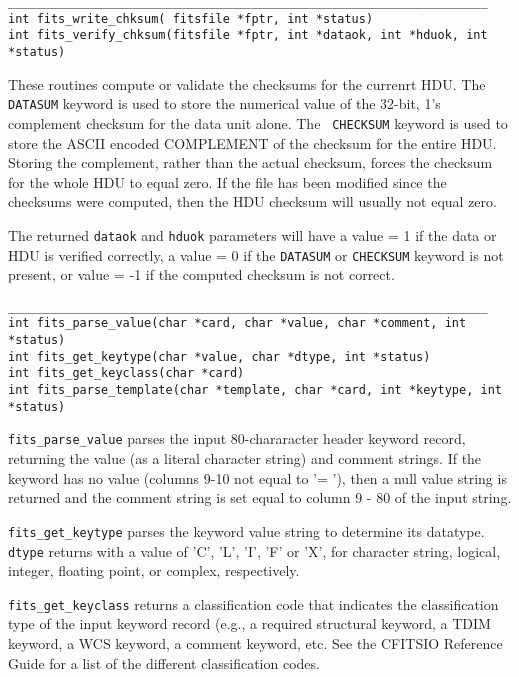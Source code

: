 \documentclass[11pt]{article}
\begin{document}
\begin{verbatim}
___________________________________________________________________
int fits_write_chksum( fitsfile *fptr, int *status)
int fits_verify_chksum(fitsfile *fptr, int *dataok, int *hduok, int *status)
\end{verbatim}

These routines  compute or validate the checksums for the currenrt
HDU.  The {\tt DATASUM} keyword is used to store the numerical value of
the 32-bit, 1's complement checksum for the data unit alone.  The {\tt
CHECKSUM} keyword is used to store the ASCII encoded COMPLEMENT of the
checksum for the entire HDU.  Storing the complement, rather than the
actual checksum, forces the checksum for the whole HDU to equal zero.
If the file has been modified since the checksums were computed, then
the HDU checksum will usually not equal zero.

The returned {\tt dataok} and {\tt hduok} parameters will have a value
= 1 if the data or HDU is verified correctly, a value = 0 if the
{\tt DATASUM} or {\tt CHECKSUM} keyword is not present, or value = -1 if the
computed checksum is not correct.


\begin{verbatim}
___________________________________________________________________
int fits_parse_value(char *card, char *value, char *comment, int *status)
int fits_get_keytype(char *value, char *dtype, int *status)
int fits_get_keyclass(char *card)
int fits_parse_template(char *template, char *card, int *keytype, int *status)

\end{verbatim}

{\tt fits\_parse\_value} parses the input 80-chararacter header keyword record, returning
the value (as a literal character string) and comment strings.  If the
keyword has no value (columns 9-10 not equal to '= '), then a null
value string is returned and the comment string is set equal to column
9 - 80 of the input string.

{\tt fits\_get\_keytype} parses the keyword value string to determine its
datatype.  {\tt dtype} returns with a value of 'C', 'L', 'I', 'F' or
'X', for character string, logical, integer, floating point, or
complex, respectively.

{\tt fits\_get\_keyclass} returns a classification code that indicates
the classification type of the input keyword record (e.g., a required
structural keyword, a TDIM keyword, a WCS keyword, a comment keyword,
etc.  See the CFITSIO Reference Guide for a list of the different
classification codes.
\end{document}
